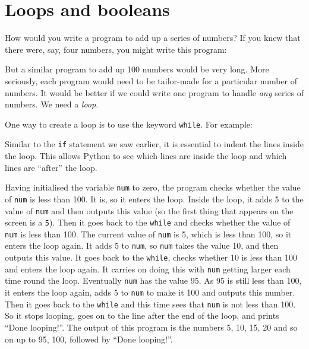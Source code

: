 \section{Loops and booleans}

How would you write a program to add up a series of numbers?
If you knew that there were, say, four numbers, you might write
this program:


But a similar program to add up 100 numbers would be very long.
More seriously, each program would need to be tailor-made for a particular
number of numbers.  It would be better if we could write one program
to handle \emph{any} series of numbers.  We need a \emph{loop}.

One way to create a loop is to use the keyword \texttt{while}.
For example:


Similar to the \texttt{if} statement we saw earlier,
it is essential to indent the lines inside the loop.
This allows Python to see which lines are inside the loop and which
lines are ``after'' the loop.


Having initialised the variable \texttt{num} to zero, the program checks
whether the value of \texttt{num} is less than 100.  It is, so it
enters the loop.  Inside the loop, it adds 5 to the value of
\texttt{num} and then outputs this value (so the first thing that
appears on the screen is a \texttt{5}).  Then it goes back to the
  \texttt{while} and checks whether the value of \texttt{num} is less than
100.  The current value of \texttt{num} is 5, which is less than 100,
so it enters the loop again.  It adds 5 to \texttt{num}, so
\texttt{num} takes the value 10, and then outputs this value.  It goes back
to the \texttt{while}, checks whether 10 is less than 100 and enters
the loop again.  It carries on doing this with \texttt{num} getting
larger each time round the loop.  Eventually \texttt{num} has the
value 95. As 95 is still less than 100, it enters the loop again, adds 5 to
\texttt{num} to make it 100 and outputs this number.  Then it goes
back to the \texttt{while} and this time sees that \texttt{num} is not
less than 100.  So it stops looping, goes on to the line after the
end of the loop, and prints ``Done looping!''.
The output of this program is the numbers 5,
10, 15, 20 and so on up to 95, 100, followed by ``Done looping!''.


